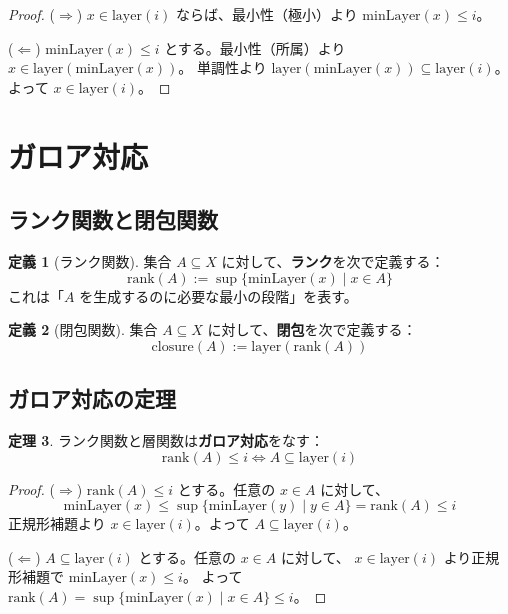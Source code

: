 \documentclass[a4paper,11pt]{ltjsarticle}
\theoremstyle{definition}
\newtheorem{definition}{定義}[section]
\newtheorem{theorem}[definition]{定理}
\newcommand{\layer}{\mathrm{layer}}
\newcommand{\rank}{\mathrm{rank}}
\newcommand{\closure}{\mathrm{closure}}
\newcommand{\minLayer}{\mathrm{minLayer}}
\begin{document}
\begin{proof}
($\Rightarrow$) $x \in \layer(i)$ ならば、最小性（極小）より $\minLayer(x) \le i$。

($\Leftarrow$) $\minLayer(x) \le i$ とする。最小性（所属）より $x \in \layer(\minLayer(x))$。
単調性より $\layer(\minLayer(x)) \subseteq \layer(i)$。よって $x \in \layer(i)$。
\end{proof}

\section{ガロア対応}\label{sec:galois}

\subsection{ランク関数と閉包関数}

\begin{definition}[ランク関数]
集合 $A \subseteq X$ に対して、\textbf{ランク}を次で定義する：
\[
  \rank(A) := \sup \{ \minLayer(x) \mid x \in A \}
\]
これは「$A$ を生成するのに必要な最小の段階」を表す。
\end{definition}

\begin{definition}[閉包関数]
集合 $A \subseteq X$ に対して、\textbf{閉包}を次で定義する：
\[
  \closure(A) := \layer(\rank(A))
\]
\end{definition}

\subsection{ガロア対応の定理}

\begin{keybox}
\begin{theorem}\label{thm:galois}
ランク関数と層関数は\textbf{ガロア対応}をなす：
\[
  \rank(A) \le i \iff A \subseteq \layer(i)
\]
\end{theorem}
\end{keybox}

\begin{proof}
($\Rightarrow$) $\rank(A) \le i$ とする。任意の $x \in A$ に対して、
\[
  \minLayer(x) \le \sup\{\minLayer(y) \mid y \in A\} = \rank(A) \le i
\]
正規形補題より $x \in \layer(i)$。よって $A \subseteq \layer(i)$。

($\Leftarrow$) $A \subseteq \layer(i)$ とする。任意の $x \in A$ に対して、
$x \in \layer(i)$ より正規形補題で $\minLayer(x) \le i$。
よって $\rank(A) = \sup\{\minLayer(x) \mid x \in A\} \le i$。
\end{proof}
\end{document}
